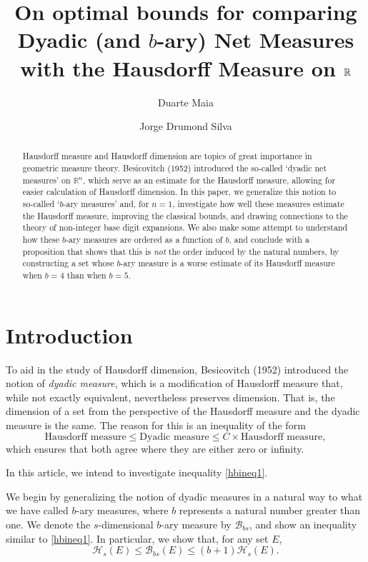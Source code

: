 \documentclass[11pt, reqno]{amsart}
\title[\textbf{Optimal bounds for $b$-ary measures}]{\textbf{On optimal bounds for comparing Dyadic (and $b$-ary) Net Measures with the Hausdorff Measure on $\R$}}
\author{Duarte Maia}
\author{Jorge Drumond Silva}
\date{}
\newcommand{\R}{\mathbb{R}}
\newcommand{\HH}{\mathcal{H}}
\newcommand{\BB}{\mathcal{B}}
\begin{document}
\begin{abstract}
Hausdorff measure and Hausdorff dimension are topics of great importance in geometric measure theory. Besicovitch (1952) introduced the so-called `dyadic net measures' on $\R^n$, which serve as an estimate for the Hausdorff measure, allowing for easier calculation of Hausdorff dimension. In this paper, we generalize this notion to so-called `$b$-ary measures' and, for $n = 1$, investigate how well these measures estimate the Hausdorff measure, improving the classical bounds, and drawing connections to the theory of non-integer base digit expansions. We also make some attempt to understand how these $b$-ary measures are ordered as a function of $b$, and conclude with a proposition that shows that this is \emph{not} the order induced by the natural numbers, by constructing a set whose $b$-ary measure is a worse estimate of its Hausdorff measure when $b = 4$ than when $b = 5$.
\end{abstract}

\maketitle

\section{Introduction}

To aid in the study of Hausdorff dimension, Besicovitch (1952) introduced the notion of \emph{dyadic measure}, which is a modification of Hausdorff measure that, while not exactly equivalent, nevertheless preserves dimension. \cite{falconer} That is, the dimension of a set from the perspective of the Hausdorff measure and the dyadic measure is the same. The reason for this is an inequality of the form
\begin{equation}\label{hbineq1}
\text{Hausdorff measure} \leq \text{Dyadic measure} \leq C \times \text{Hausdorff measure},
\end{equation}
which ensures that both agree where they are either zero or infinity.

In this article, we intend to investigate inequality \eqref{hbineq1}.

We begin by generalizing the notion of dyadic measures in a natural way to what we have called $b$-ary measures, where $b$ represents a natural number greater than one. We denote the $s$-dimensional $b$-ary measure by $\BB_{bs}$, and show an inequality similar to \eqref{hbineq1}. In particular, we show that, for any set $E$,
\begin{equation}\label{hbineq2}
\HH_s(E) \leq \BB_{bs}(E) \leq (b+1) \HH_s(E).
\end{equation}
\end{document}
